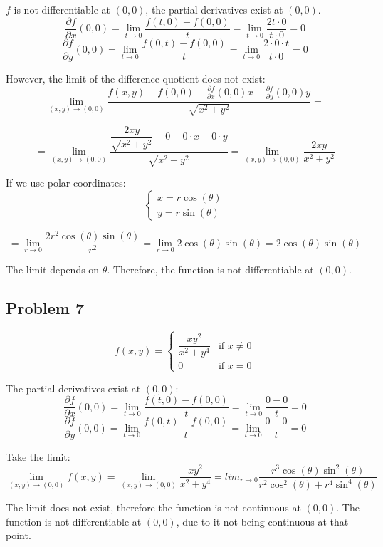 \documentclass[11pt]{article}
\begin{document}
$f$ is not differentiable at $(0,0)$, the partial derivatives exist at $(0,0)$.
\[
\frac{\partial f}{\partial x}(0,0) = \lim_{t \to 0} \frac{f(t,0) - f(0,0)}{t} = \lim_{t \to 0} \frac{2t \cdot 0}{t \cdot 0} = 0
\]
\[
\frac{\partial f}{\partial y}(0,0) = \lim_{t \to 0} \frac{f(0,t) - f(0,0)}{t} = \lim_{t \to 0} \frac{2 \cdot 0 \cdot t}{t \cdot 0} = 0
\]

However, the limit of the difference quotient does not exist:
\[
\lim_{(x,y) \to (0,0)} \frac{f(x,y) - f(0,0) - \frac{\partial f}{\partial x}(0,0)x - \frac{\partial f}{\partial y}(0,0)y}{\sqrt{x^2 + y^2}} =
\]

\[
= \lim_{(x,y) \to (0,0)} \dfrac{\dfrac{2xy}{\sqrt{x^2 + y^2}} - 0 - 0 \cdot x - 0 \cdot y}{\sqrt{x^2 + y^2}} = \lim_{(x,y) \to (0,0)} \frac{2xy}{x^2 + y^2}
\]

If we use polar coordinates:
\[
\begin{cases}
    x = r \cos(\theta) \\
    y = r \sin(\theta)
\end{cases}
\]

\[
= \lim_{r \to 0} \frac{2r^2 \cos(\theta) \sin(\theta)}{r^2} = \lim_{r \to 0} 2 \cos(\theta) \sin(\theta) = 2 \cos(\theta) \sin(\theta)
\]

The limit depends on $\theta$. Therefore, the function is not differentiable at $(0,0)$.

\subsection*{Problem 7}
\[
f(x,y) = 
\begin{cases}
    \dfrac{xy^2}{x^2 + y^4} & \text{if } x \neq 0 \\
    0 & \text{if } x = 0
\end{cases}
\]

The partial derivatives exist at $(0,0)$:
\[
\frac{\partial f}{\partial x}(0,0) = \lim_{t \to 0} \frac{f(t,0) - f(0,0)}{t} = \lim_{t \to 0} \frac{0 - 0}{t} = 0
\]
\[
\frac{\partial f}{\partial y}(0,0) = \lim_{t \to 0} \frac{f(0,t) - f(0,0)}{t} = \lim_{t \to 0} \frac{0 - 0}{t} = 0
\]

Take the limit:
\[
\lim_{(x,y) \to (0,0)} f(x,y) = \lim_{(x,y) \to (0,0)} \frac{xy^2}{x^2 + y^4} = lim_{r \to 0} \frac{r^3 \cos(\theta) \sin^2(\theta)}{r^2 \cos^2(\theta) + r^4 \sin^4(\theta)}
\]

The limit does not exist, therefore the function is not continuous at $(0,0)$. The function is not differentiable at $(0,0)$, due to it not being continuous at that point.
\end{document}
